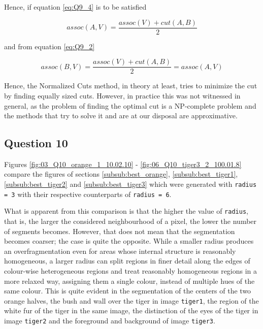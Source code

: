 Hence, if equation \ref{eq:Q9_4} is to be satisfied

\begin{equation}
  assoc(A,V) = \frac{assoc(V) + cut(A,B)}{2}
\end{equation}

and from equation \ref{eq:Q9_2}

\begin{equation}
  assoc(B,V) = \frac{assoc(V) + cut(A,B)}{2} = assoc(A,V)
\end{equation}

Hence, the Normalized Cuts method, in theory at least, tries to minimize the
cut by finding equally sized cuts. However, in practice this was not witnessed
in general, as the problem of finding the optimal cut is a NP-complete problem
and the methods that try to solve it and are at our disposal are approximative.

\subsection{Question 10}

Figures \ref{fig:03_Q10_orange_1_10.02.10} - \ref{fig:06_Q10_tiger3_2_100.01.8}
compare the figures of sections \ref{subsub:best_orange},
\ref{subsub:best_tiger1}, \ref{subsub:best_tiger2} and \ref{subsub:best_tiger3}
which were generated with \texttt{radius = 3} with their respective counterparts
of \texttt{radius = 6}.

What is apparent from this comparison is that the higher the value of
\texttt{radius}, that is, the larger the considered neighbourhood of a pixel,
the lower the number of segments becomes.
However, that does not mean that the segmentation becomes coarser; the case
is quite the opposite. While a smaller radius produces an overfragmentation even
for areas whose internal structure is reasonably homogeneous, a larger radius
can split regions in finer detail along the edges of colour-wise heterogeneous
regions and treat reasonably homogeneous regions in a more relaxed way, assigning
them a single colour, instead of multiple hues of the same colour. This is quite
evident in the segmentation of the centers of the two orange halves, the bush and
wall over the tiger in image \texttt{tiger1}, the region of the white fur of the
tiger in the same image, the distinction of the eyes of the tiger in image
\texttt{tiger2} and the foreground and background of image \texttt{tiger3}.


